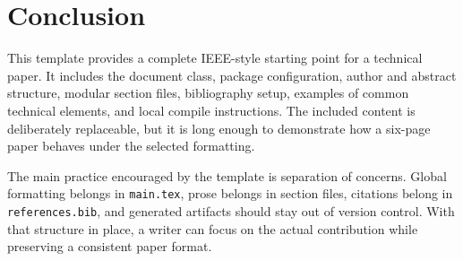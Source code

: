 \section{Conclusion}

This template provides a complete IEEE-style starting point for a technical paper. It includes the document class, package configuration, author and abstract structure, modular section files, bibliography setup, examples of common technical elements, and local compile instructions. The included content is deliberately replaceable, but it is long enough to demonstrate how a six-page paper behaves under the selected formatting.

The main practice encouraged by the template is separation of concerns. Global formatting belongs in \texttt{main.tex}, prose belongs in section files, citations belong in \texttt{references.bib}, and generated artifacts should stay out of version control. With that structure in place, a writer can focus on the actual contribution while preserving a consistent paper format.

